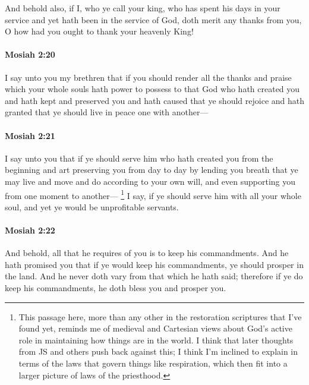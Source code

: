 			And behold also, if I, who ye call your king,
			who has spent his days in your service
			and yet hath been in the service of God,
			doth merit any thanks from you,
			O how had you ought to thank your heavenly King!
			
		\paragraph{Mosiah 2:20} %
			\label{MOSIAH-2-20}
			
			I say unto you my brethren
			that if you should render all the thanks and praise
			which your whole souls hath power to possess
			to that God who hath created you
			and hath kept and preserved you
			and hath caused that ye should rejoice
			and hath granted that ye should live in peace one with another---
			
		\paragraph{Mosiah 2:21} %
			\label{MOSIAH-2-21}
			
			I say unto you that
			if ye should serve him who hath created you from the beginning
			and art preserving you from day to day by lending you breath
			that ye may live and move and do according to your own will,
			and even supporting you from one moment to another---%
				\footnote{%
					\label{MOSIAH-2-21-NOTE-supporting}%
					This passage here, more than any other in the restoration scriptures that I've found yet, reminds me of medieval and Cartesian views about God's active role in maintaining how things are in the world. I think that later thoughts from JS and others push back against this; I think I'm inclined to explain in terms of the laws that govern things like respiration, which then fit into a larger picture of laws of the priesthood.
					}
			I say, if ye should serve him with all your whole soul,
			and yet ye would be unprofitable servants.
			
		\paragraph{Mosiah 2:22} %
			\label{MOSIAH-2-22}
			
			And behold, all that he requires of you is to keep his commandments.
			And he hath promised you that if ye would keep his commandments,
			ye should prosper in the land.
			And he never doth vary from that which he hath said;
			therefore if ye do keep his commandments,
			he doth bless you and prosper you.
			
